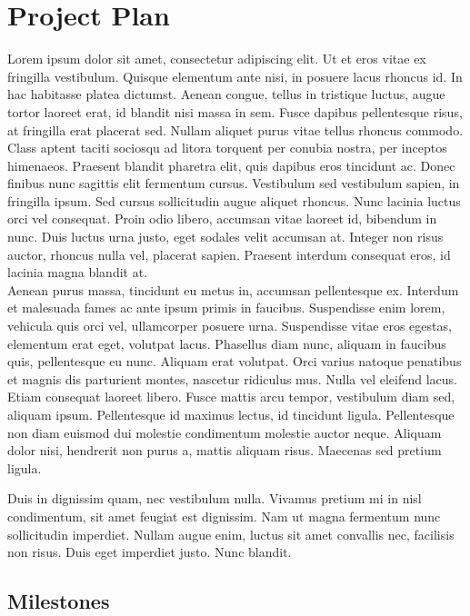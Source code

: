\section{Project Plan}

Lorem ipsum dolor sit amet, consectetur adipiscing elit. Ut et eros vitae ex fringilla vestibulum. Quisque elementum ante nisi, in posuere lacus rhoncus id. In hac habitasse platea dictumst. Aenean congue, tellus in tristique luctus, augue tortor laoreet erat, id blandit nisi massa in sem. Fusce dapibus pellentesque risus, at fringilla erat placerat sed. Nullam aliquet purus vitae tellus rhoncus commodo. Class aptent taciti sociosqu ad litora torquent per conubia nostra, per inceptos himenaeos. Praesent blandit pharetra elit, quis dapibus eros tincidunt ac. Donec finibus nunc sagittis elit fermentum cursus. Vestibulum sed vestibulum sapien, in fringilla ipsum. Sed cursus sollicitudin augue aliquet rhoncus. Nunc lacinia luctus orci vel consequat. Proin odio libero, accumsan vitae laoreet id, bibendum in nunc. Duis luctus urna justo, eget sodales velit accumsan at. Integer non risus auctor, rhoncus nulla vel, placerat sapien. Praesent interdum consequat eros, id lacinia magna blandit at. \\

Aenean purus massa, tincidunt eu metus in, accumsan pellentesque ex. Interdum et malesuada fames ac ante ipsum primis in faucibus. Suspendisse enim lorem, vehicula quis orci vel, ullamcorper posuere urna. Suspendisse vitae eros egestas, elementum erat eget, volutpat lacus. Phasellus diam nunc, aliquam in faucibus quis, pellentesque eu nunc. Aliquam erat volutpat. Orci varius natoque penatibus et magnis dis parturient montes, nascetur ridiculus mus. Nulla vel eleifend lacus. Etiam consequat laoreet libero. Fusce mattis arcu tempor, vestibulum diam sed, aliquam ipsum. Pellentesque id maximus lectus, id tincidunt ligula. Pellentesque non diam euismod dui molestie condimentum molestie auctor neque. Aliquam dolor nisi, hendrerit non purus a, mattis aliquam risus. Maecenas sed pretium ligula.

Duis in dignissim quam, nec vestibulum nulla. Vivamus pretium mi in nisl condimentum, sit amet feugiat est dignissim. Nam ut magna fermentum nunc sollicitudin imperdiet. Nullam augue enim, luctus sit amet convallis nec, facilisis non risus. Duis eget imperdiet justo. Nunc blandit.

\subsection{Milestones}


